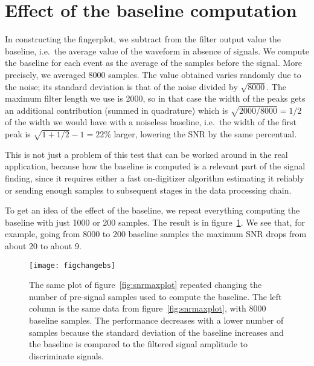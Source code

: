 \section{Effect of the baseline computation}

In constructing the fingerplot, we subtract from the filter output value the
baseline, i.e.\ the average value of the waveform in absence of signals. We
compute the baseline for each event as the average of the samples before the
signal. More precisely, we averaged \num{8000} samples. The value obtained
varies randomly due to the noise; its standard deviation is that of the noise
divided by $\sqrt{8000}$. The maximum filter length we use is 2000, so in that
case the width of the peaks gets an additional contribution (summed in
quadrature) which is $\sqrt{2000/8000} = 1/2$ of the width we would have with a
noiseless baseline, i.e.\ the width of the first peak is $\sqrt{1 + 1/2} - 1 =
\SI{22}\%$ larger, lowering the SNR by the same percentual.

This is not just a problem of this test that can be worked around in the real
application, because how the baseline is computed is a relevant part of the
signal finding, since it requires either a fast on-digitizer algorithm
estimating it reliably or sending enough samples to subsequent stages in the
data processing chain.

To get an idea of the effect of the baseline, we repeat everything computing
the baseline with just 1000 or 200 samples. The result is in
figure~\ref{fig:changebs}. We see that, for example, going from 8000 to 200
baseline samples the maximum SNR drops from about 20 to about 9.


\begin{figure}
    \hspace{-0.27\textwidth}
    \texttt{[image: figchangebs]}
    
    \caption{The same plot of figure~\ref{fig:snrmaxplot} repeated changing the
    number of pre-signal samples used to compute the baseline. The left column
    is the same data from figure~\ref{fig:snrmaxplot}, with 8000 baseline
    samples. The performance decreases with a lower number of samples because
    the standard deviation of the baseline increases and the baseline is
    compared to the filtered signal amplitude to discriminate signals.}
    
    \label{fig:changebs}
\end{figure}

